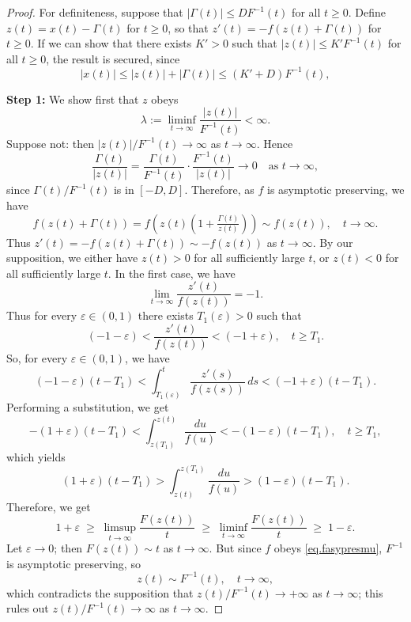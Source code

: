 \documentclass[a4paper,10pt,reqno]{amsart}
\numberwithin{equation}{section}
\theoremstyle{definition}
\theoremstyle{remark}
\DeclareMathOperator{\1}{\mathbbm 1}
\begin{document}
	\begin{proof}
		For definiteness, suppose that $|\Gamma(t)|\leq DF^{-1}(t)$ for all $t\geq 0$. 
		Define $z(t) = x(t) - \Gamma(t)$ for $t\geq 0$, so that $z'(t)=-f(z(t)+\Gamma(t))$ for $t\geq 0$. If we can show that there exists $K'>0$ such that $|z(t)| \leq K' F^{-1}(t)$ for all $t\geq 0$, the result is secured, since 
		\[
		|x(t)| \leq |z(t)| + |\Gamma(t)| \leq (K' + D) F^{-1}(t),						
		\]
		
		\textbf{Step 1:} We show first that $z$ obeys 
		$$\lambda := \liminf_{t \to \infty}\frac{|z(t)|}{F^{-1}(t)} < \infty.$$
		Suppose not: then 
		$|z(t)|/F^{-1}(t) \to \infty$ as $t\to\infty$. 
		Hence						
		\[
		\frac{\Gamma(t)}{|z(t)|} 						= \frac{\Gamma(t)}{F^{-1}(t)} \cdot \frac{F^{-1}(t)}{|z(t)|}
		\to 0 \quad \text{as } t \to \infty,
		\]
		since $\Gamma(t)/F^{-1}(t)$ is in $[-D,D]$. 					
		Therefore, as $f$ is asymptotic preserving, we have  
		\[						
		f(z(t) + \Gamma(t))= f\!\left(z(t)\left(1 + \tfrac{\Gamma(t)}{z(t)}\right)\right) 
		\sim f(z(t)), \quad t \to \infty.
		\]						
		Thus $z'(t) = - f(z(t) + \Gamma(t)) \sim - f(z(t))$ as $t\to\infty$. By our supposition, we either have $z(t) > 0$ for all sufficiently large $t$, or $z(t) < 0$ for all sufficiently large $t$. In the first case, we have
		\[
		\lim_{t \to \infty} \frac{z'(t)}{f(z(t))} = -1.
		\]
		Thus for every $\varepsilon \in (0,1)$ there exists $T_{1}(\varepsilon) > 0$ such that
		\[
		(-1 - \varepsilon) < \frac{z'(t)}{f(z(t))} < (-1 + \varepsilon), 
		\quad  t \geq T_{1}.
		\]
		So, for every $\varepsilon \in (0,1)$, we have 
		\[
		(-1 - \varepsilon)(t - T_{1}) 
		< \int_{T_{1}(\varepsilon)}^{t} \frac{z'(s)}{f(z(s))}\, ds 
		< (-1 + \varepsilon)(t - T_{1}).
		\]
		Performing a substitution, we get 
		\[
		-(1+\varepsilon)(t - T_{1}) 
		< \int_{z(T_{1})}^{z(t)} \frac{du}{f(u)} 
		< -(1-\varepsilon)(t - T_{1}), \quad t\geq T_1,
		\]
		which yields
		\[
		(1+\varepsilon)(t - T_{1}) 
		> \int_{z(t)}^{z(T_{1})} \frac{du}{f(u)} 
		> (1-\varepsilon)(t - T_{1}).
		\]
		Therefore, we get
		\[
		1 + \varepsilon \;\geq\; \limsup_{t \to \infty} \frac{F(z(t))}{t} 
		\;\geq\; \liminf_{t \to \infty} \frac{F(z(t))}{t} \;\geq\; 1 - \varepsilon.
		\]
		Let $\varepsilon \to 0$; then $F(z(t)) \sim t$ as $t \to \infty$.
		But since $f$ obeys \eqref{eq.fasypresmu}, $F^{-1}$ is asymptotic preserving, so 
		\[
		z(t) \sim F^{-1}(t), \quad t\to\infty,
		\]
		which contradicts the supposition that $z(t)/F^{-1}(t)\to + \infty$ as $t\to\infty$; this rules out $z(t)/F^{-1}(t)\to\infty$ as $t\to\infty$. 
		

\end{proof}
\end{document}
